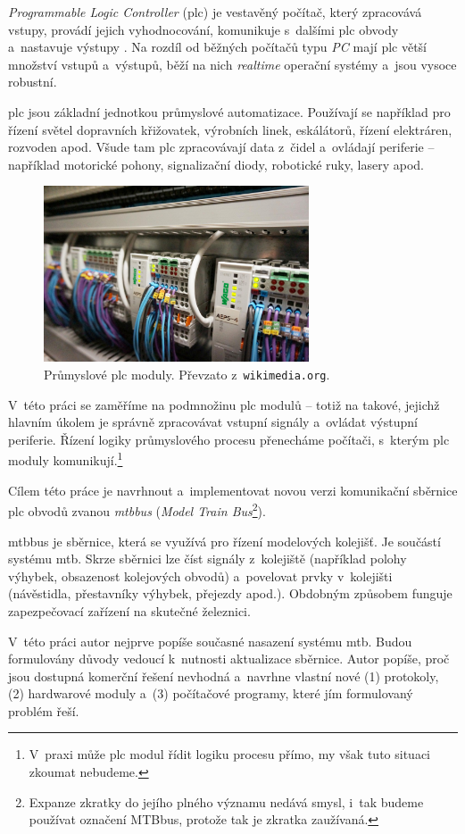 \textit{Programmable Logic Controller} (\gls{plc}) je vestavěný počítač, který
zpracovává vstupy, provádí jejich vyhodnocování, komunikuje s~dalšími \gls{plc}
obvody a~nastavuje výstupy \cite{plc:web}. Na rozdíl od běžných počítačů typu
\textit{PC} mají \gls{plc} větší množství vstupů a~výstupů, běží na nich
\textit{realtime} operační systémy a~jsou vysoce robustní.

\gls{plc} jsou základní jednotkou průmyslové automatizace. Používají se
například pro řízení světel dopravních křižovatek, výrobních linek, eskálátorů,
řízení elektráren, rozvoden apod. Všude tam \gls{plc} zpracovávají data z~čidel
a~ovládají periferie – například motorické pohony, signalizační diody,
robotické ruky, lasery apod.

\begin{figure}[ht]
\includegraphics[width=0.7\textwidth]{data/plc.jpg}
\caption{Průmyslové \gls{plc} moduly. Převzato z~\texttt{wikimedia.org}.}
\label{fig:mtbusb-prototype}
\end{figure}

V~této práci se zaměříme na podmnožinu \gls{plc} modulů – totiž na takové,
jejichž hlavním úkolem je správně zpracovávat vstupní signály a~ovládat výstupní
periferie. Řízení logiky průmyslového procesu přenecháme počítači, s~kterým
\gls{plc} moduly komunikují.\footnote{V~praxi může \gls{plc} modul řídit logiku
procesu přímo, my však tuto situaci zkoumat nebudeme.}

Cílem této práce je navrhnout a~implementovat novou verzi komunikační sběrnice
\gls{plc} obvodů zvanou \textit{\gls{mtbbus}} (\textit{Model Train
Bus}\footnote{Expanze zkratky do jejího plného významu nedává smysl, i~tak
budeme používat označení MTBbus, protože tak je zkratka zaužívaná.}).

\gls{mtbbus} je sběrnice, která se využívá pro řízení modelových kolejišť.
Je součástí systému \gls{mtb}. Skrze sběrnici lze číst signály z~kolejiště
(například polohy výhybek, obsazenost kolejových obvodů) a~povelovat prvky
v~kolejišti (návěstidla, přestavníky výhybek, přejezdy apod.). Obdobným
způsobem funguje zapezpečovací zařízení na skutečné železnici.

V~této práci autor nejprve popíše současné nasazení systému \gls{mtb}. Budou
formulovány důvody vedoucí k~nutnosti aktualizace sběrnice. Autor popíše, proč
jsou dostupná komerční řešení nevhodná a~navrhne vlastní nové (1) protokoly,
(2) hardwarové moduly a~(3) počítačové programy, které jím formulovaný problém
řeší.
